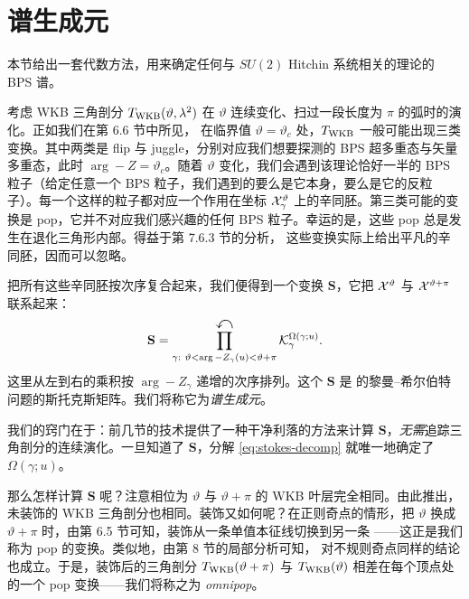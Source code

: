 
\section{谱生成元}\label{sec:UniversalStokesMatrix}

本节给出一套代数方法，用来确定任何与 $SU(2)$ Hitchin 系统相关的理论的 BPS 谱。

考虑 WKB 三角剖分 $T_{\rm WKB}(\vartheta,\lambda^2)$ 在 $\vartheta$ 连续变化、扫过一段长度为 $\pi$ 的弧时的演化。正如我们在第 6.6 节中所见，%
在临界值 $\vartheta=\vartheta_c$ 处，$T_{\rm WKB}$ 一般可能出现三类变换。其中两类是 flip 与 juggle，分别对应我们想要探测的 BPS 超多重态与矢量多重态，此时 $\arg -Z=\vartheta_c$。随着 $\vartheta$ 变化，我们会遇到该理论恰好一半的 BPS 粒子（给定任意一个 BPS 粒子，我们遇到的要么是它本身，要么是它的反粒子）。每一个这样的粒子都对应一个作用在坐标 $\mathcal{X}^\vartheta_\gamma$ 上的辛同胚。第三类可能的变换是 pop，它并不对应我们感兴趣的任何 BPS 粒子。幸运的是，这些 pop 总是发生在退化三角形内部。得益于第 7.6.3 节的分析，%
这些变换实际上给出平凡的辛同胚，因而可以忽略。

把所有这些辛同胚按次序复合起来，我们便得到一个变换 $\mathbf S$，它把 $\mathcal{X}^\vartheta$ 与 $\mathcal{X}^{\vartheta+\pi}$ 联系起来：
\begin{equation}\label{eq:stokes-decomp}
\mathbf S = \prod_{\gamma:\ \vartheta < \arg -Z_{\gamma}(u) < \vartheta+\pi}^{\text{\Large$\curvearrowleft$}} \mathcal{K}_\gamma^{\Omega(\gamma;u)}.
\end{equation}
这里从左到右的乘积按 $\arg -Z_\gamma$ 递增的次序排列。这个 $\mathbf S$ 是 \cite{Gaiotto:2008cd} 的黎曼--希尔伯特问题的斯托克斯矩阵。我们将称它为\emph{谱生成元}。

我们的窍门在于：前几节的技术提供了一种干净利落的方法来计算 $\mathbf S$，\emph{无需}追踪三角剖分的连续演化。一旦知道了 $\mathbf S$，分解 \eqref{eq:stokes-decomp} 就唯一地确定了 $\Omega(\gamma;u)$。

那么怎样计算 $\mathbf S$ 呢？注意相位为 $\vartheta$ 与 $\vartheta+\pi$ 的 WKB 叶层完全相同。由此推出，未装饰的 WKB 三角剖分也相同。装饰又如何呢？在正则奇点的情形，把 $\vartheta$ 换成 $\vartheta+\pi$ 时，由第 6.5 节可知，装饰从一条单值本征线切换到另一条%
——这正是我们称为 pop 的变换。类似地，由第 8 节的局部分析可知，%
对不规则奇点同样的结论也成立。于是，装饰后的三角剖分 $T_{\rm WKB}(\vartheta+\pi)$ 与 $T_{\rm WKB}(\vartheta)$ 相差在每个顶点处的一个 pop 变换——我们将称之为 \emph{omnipop}。

